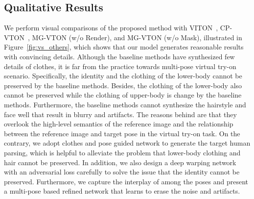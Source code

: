 \documentclass[10pt,twocolumn,letterpaper]{article}
\begin{document}
\begin{table}[htbp]
\centering
\caption{Comparisons on MPV and DeepFashion. }
\vspace{2mm}
\label{tab:ssim_is}
\vspace{-2mm}
\end{table}

\subsection{Qualitative Results}
We perform visual comparisons of the proposed method with VITON~\cite{han2017viton}, CP-VTON~\cite{wang2018cpvton}, MG-VTON (w/o Render), and MG-VTON (w/o Mask), illustrated in Figure~\ref{fig:vs_others}, which shows that our model generates reasonable results with convincing details. Although the baseline methods have synthesized few details of clothes, it is far from the practice towards multi-pose virtual try-on scenario. Specifically, the identity and the clothing of the lower-body cannot be preserved by the baseline methods. Besides, the clothing of the lower-body also cannot be preserved while the clothing of upper-body is change by the baseline methods. Furthermore, the baseline methods cannot synthesize the hairstyle and face well that result in blurry and artifacts. The reasons behind are that they overlook the high-level semantics of the reference image and the relationship between the reference image and target pose in the virtual try-on task. On the contrary, we adopt clothes and pose guided network to generate the target human parsing, which is helpful to alleviate the problem that lower-body clothing and hair cannot be preserved. In addition, we also design a deep warping network with an adversarial loss carefully to solve the issue that the identity cannot be preserved. Furthermore, we capture the interplay of among the poses and present a multi-pose based refined network that learns to erase the noise and artifacts. 
\end{document}
